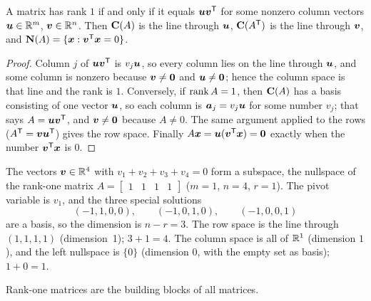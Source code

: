 \begin{theorem}\label{thm:u12-rank1}
A matrix has rank $1$ if and only if it equals $\boldsymbol{u}\boldsymbol{v}^{\mathsf{T}}$ for some nonzero column vectors
$\boldsymbol{u}\in\mathbb{R}^m$, $\boldsymbol{v}\in\mathbb{R}^n$. Then $\mathbf{C}(A)$ is the line through $\boldsymbol{u}$, $\mathbf{C}(A^{\mathsf{T}})$ is the
line through $\boldsymbol{v}$, and $\mathbf{N}(A)=\{\boldsymbol{x}:\boldsymbol{v}^{\mathsf{T}}\boldsymbol{x}=0\}$.
\end{theorem}
\begin{proof}
Column $j$ of $\boldsymbol{u}\boldsymbol{v}^{\mathsf{T}}$ is $v_j\boldsymbol{u}$, so every column lies on the line through $\boldsymbol{u}$,
and some column is nonzero because $\boldsymbol{v}\ne\boldsymbol{0}$ and $\boldsymbol{u}\ne\boldsymbol{0}$; hence the column space
is that line and the rank is $1$. Conversely, if $\operatorname{rank} A=1$, then $\mathbf{C}(A)$ has a basis consisting
of one vector $\boldsymbol{u}$, so each column is $\boldsymbol{a}_j=v_j\boldsymbol{u}$ for some number $v_j$; that says
$A=\boldsymbol{u}\boldsymbol{v}^{\mathsf{T}}$, and $\boldsymbol{v}\ne\boldsymbol{0}$ because $A\ne0$. The same argument applied to the rows
($A^{\mathsf{T}}=\boldsymbol{v}\boldsymbol{u}^{\mathsf{T}}$) gives the row space. Finally
$A\boldsymbol{x}=\boldsymbol{u}(\boldsymbol{v}^{\mathsf{T}}\boldsymbol{x})=\boldsymbol{0}$ exactly when the number $\boldsymbol{v}^{\mathsf{T}}\boldsymbol{x}$ is $0$.
\end{proof}

\label{ex:u12-sum0}
The vectors $\boldsymbol{v}\in\mathbb{R}^4$ with $v_1+v_2+v_3+v_4=0$ form a subspace, the nullspace of the
rank-one matrix $A=\begin{bmatrix}1&1&1&1\end{bmatrix}$ ($m=1$, $n=4$, $r=1$). The pivot variable
is $v_1$, and the three special solutions
\[
(-1,1,0,0),\qquad(-1,0,1,0),\qquad(-1,0,0,1)
\]
are a basis, so the dimension is $n-r=3$. The row space is the line through $(1,1,1,1)$
(dimension~1); $3+1=4$. The column space is all of $\mathbb{R}^1$ (dimension $1$), and the left nullspace is
$\{0\}$ (dimension $0$, with the empty set as basis); $1+0=1$.
\end{example}

Rank-one matrices are the building blocks of all matrices.

